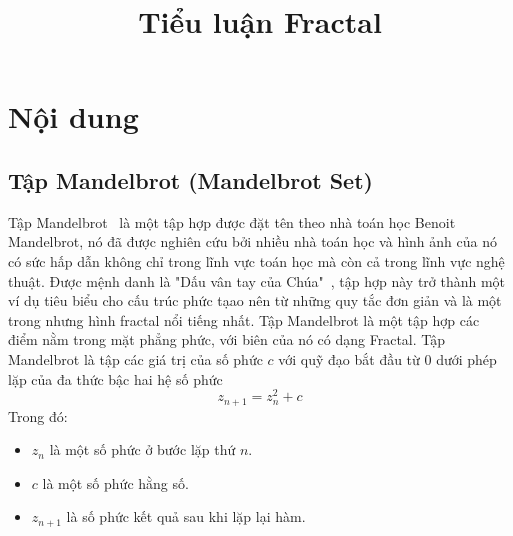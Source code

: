 \documentclass[oneside,final]{report}
\title{\LARGE Tiểu luận Fractal}
\begin{document}
\coverpage%


\tableofcontents
\listoffigures
\listoftables
\section{Nội dung}
\subsection{Tập Mandelbrot (Mandelbrot Set)}
Tập Mandelbrot~\cite{wiki:fractal,wiki:mandelbrot-set,enwiki:mandelbrot-set} là một tập hợp được đặt tên theo nhà toán học Benoit Mandelbrot, nó đã được nghiên cứu bởi nhiều nhà toán học và hình ảnh của nó có sức hấp dẫn không chỉ trong lĩnh vực toán học mà còn cả trong lĩnh vực nghệ thuật.
 Được mệnh danh là "Dấu vân tay của Chúa"~\cite{xavier2021thumbprint}, tập hợp này trở thành một ví dụ tiêu biểu cho cấu trúc phức tạao nên từ những quy tắc đơn giản và là một trong nhưng hình fractal nổi tiếng nhất.
Tập Mandelbrot là một tập hợp các điểm nằm trong mặt phẳng phức, với biên của nó có dạng Fractal. Tập Mandelbrot là tập các giá trị của số phức $c$ với quỹ đạo bắt đầu từ 0 dưới phép lặp của đa thức bậc hai hệ số phức $$z_{n+1}=z_n^2 + c$$
Trong đó:
\begin{itemize}
  \item $z_n$ là một số phức ở bước lặp thứ $n$.
  \item $c$ là một số phức hằng số.
  \item $z_{n+1}$ là số phức kết quả sau khi lặp lại hàm.
\end{itemize}
\end{document}
